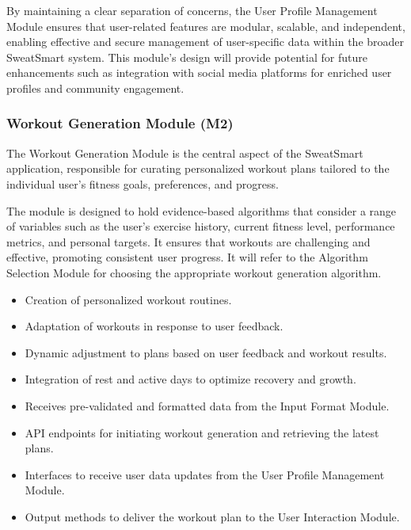 \documentclass[12pt, titlepage]{article}
\begin{document}
By maintaining a clear separation of concerns, the User Profile Management Module ensures that user-related features are modular, scalable, and independent, enabling effective and secure management of user-specific data within the broader SweatSmart system. This module's design will provide potential for future enhancements such as integration with social media platforms for enriched user profiles and community engagement.


\subsubsection{Workout Generation Module (M2)}

The Workout Generation Module is the central aspect of the SweatSmart application, responsible for curating personalized workout plans tailored to the individual user's fitness goals, preferences, and progress.

\begin{description}[leftmargin=0pt]
\item[Secrets:] 
The module is designed to hold evidence-based algorithms that consider a range of variables such as the user's exercise history, current fitness level, performance metrics, and personal targets. It ensures that workouts are challenging and effective, promoting consistent user progress. It will refer to the Algorithm Selection Module for choosing the appropriate workout generation algorithm.
\end{description}

\begin{description}[leftmargin=0pt]
\item[Services:] 
\end{description}
\begin{itemize}[leftmargin=*]
\item Creation of personalized workout routines.
\item Adaptation of workouts in response to user feedback.
\item Dynamic adjustment to plans based on user feedback and workout results.
\item Integration of rest and active days to optimize recovery and growth.
\item Receives pre-validated and formatted data from the Input Format Module.
\end{itemize}

\begin{description}[leftmargin=0pt]
\item[Interfaces:] 
\end{description}
\begin{itemize}[leftmargin=*]
\item API endpoints for initiating workout generation and retrieving the latest plans.
\item Interfaces to receive user data updates from the User Profile Management Module.
\item Output methods to deliver the workout plan to the User Interaction Module.
\end{itemize}
\end{document}
